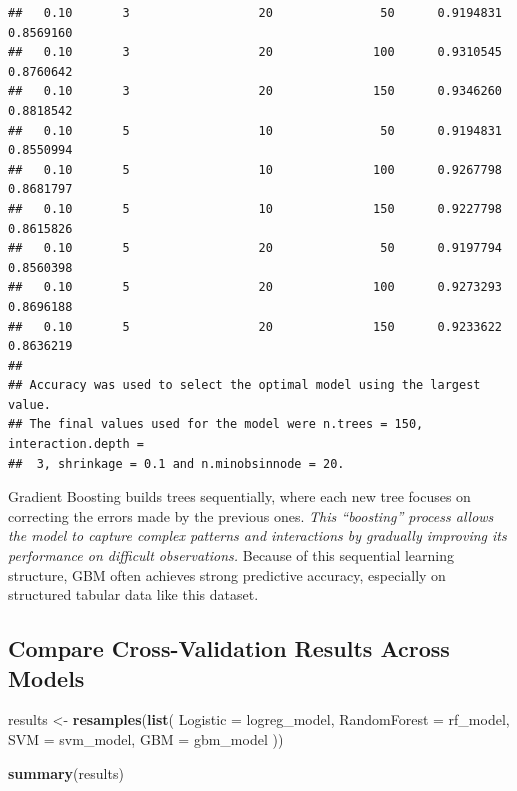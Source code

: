 \documentclass[
]{article}
\newenvironment{Shaded}{\begin{snugshade}}{\end{snugshade}}
\newcommand{\AttributeTok}[1]{\textcolor[rgb]{0.13,0.29,0.53}{#1}}
\newcommand{\FunctionTok}[1]{\textcolor[rgb]{0.13,0.29,0.53}{\textbf{#1}}}
\newcommand{\NormalTok}[1]{#1}
\newcommand{\OtherTok}[1]{\textcolor[rgb]{0.56,0.35,0.01}{#1}}
\begin{document}
\begin{verbatim}
##   0.10       3                  20               50      0.9194831  0.8569160
##   0.10       3                  20              100      0.9310545  0.8760642
##   0.10       3                  20              150      0.9346260  0.8818542
##   0.10       5                  10               50      0.9194831  0.8550994
##   0.10       5                  10              100      0.9267798  0.8681797
##   0.10       5                  10              150      0.9227798  0.8615826
##   0.10       5                  20               50      0.9197794  0.8560398
##   0.10       5                  20              100      0.9273293  0.8696188
##   0.10       5                  20              150      0.9233622  0.8636219
## 
## Accuracy was used to select the optimal model using the largest value.
## The final values used for the model were n.trees = 150, interaction.depth =
##  3, shrinkage = 0.1 and n.minobsinnode = 20.
\end{verbatim}

Gradient Boosting builds trees sequentially, where each new tree focuses
on correcting the errors made by the previous ones. \emph{This
``boosting'' process allows the model to capture complex patterns and
interactions by gradually improving its performance on difficult
observations.} Because of this sequential learning structure, GBM often
achieves strong predictive accuracy, especially on structured tabular
data like this dataset.

\subsection{Compare Cross-Validation Results Across
Models}\label{compare-cross-validation-results-across-models}

\begin{Shaded}
\begin{Highlighting}[]
\NormalTok{results }\OtherTok{\textless{}{-}} \FunctionTok{resamples}\NormalTok{(}\FunctionTok{list}\NormalTok{(}
  \AttributeTok{Logistic =}\NormalTok{ logreg\_model,}
  \AttributeTok{RandomForest =}\NormalTok{ rf\_model,}
  \AttributeTok{SVM =}\NormalTok{ svm\_model,}
  \AttributeTok{GBM =}\NormalTok{ gbm\_model}
\NormalTok{))}

\FunctionTok{summary}\NormalTok{(results)}
\end{Highlighting}
\end{Shaded}
\end{document}
